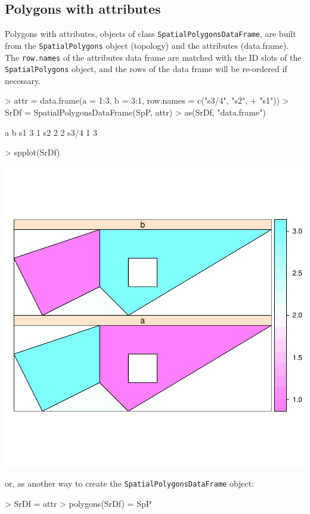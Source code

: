 \documentclass{article}
\begin{document}
\subsection{Polygons with attributes}
Polygons with attributes, objects of class {\tt SpatialPolygonsDataFrame},
are built from the {\tt SpatialPolygons} object (topology) and the attributes
(data.frame). The {\tt row.names} of the attributes data frame are matched with the ID slots of the {\tt SpatialPolygons} object, and the rows of the data frame will be re-ordered if necessary.
\begin{Schunk}
\begin{Sinput}
> attr = data.frame(a = 1:3, b = 3:1, row.names = c("s3/4", "s2", 
+     "s1"))
> SrDf = SpatialPolygonsDataFrame(SpP, attr)
> as(SrDf, "data.frame")
\end{Sinput}
\begin{Soutput}
     a b
s1   3 1
s2   2 2
s3/4 1 3
\end{Soutput}
\begin{Sinput}
> spplot(SrDf)
\end{Sinput}
\end{Schunk}

\includegraphics{sp-025}

or, as another way to create the {\tt SpatialPolygonsDataFrame} object:
\begin{Schunk}
\begin{Sinput}
> SrDf = attr
> polygons(SrDf) = SpP
\end{Sinput}
\end{Schunk}
\end{document}
